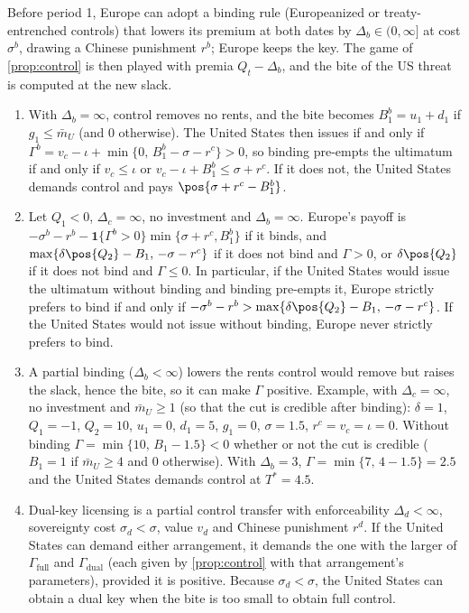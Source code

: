 \begin{remark}\label{rem:bind}
Before period 1, Europe can adopt a binding rule (Europeanized or treaty-entrenched controls) that lowers its premium at both dates by $\Delta_b\in(0,\infty]$ at cost $\sigma^b$, drawing a Chinese punishment $r^b$; Europe keeps the key. The game of \cref{prop:control} is then played with premia $Q_t-\Delta_b$, and the bite of the US threat is computed at the new slack.
\begin{enumerate}[label=(\alph*)]
\item With $\Delta_b=\infty$, control removes no rents, and the bite becomes $B_1^b=u_1+d_1$ if $g_1\le\bar m_U$ (and $0$ otherwise). The United States then issues if and only if $\Gamma^b=v_c-\iota+\min\{0,\,B_1^b-\sigma-r^c\}>0$, so binding pre-empts the ultimatum if and only if $v_c\le\iota$ or $v_c-\iota+B_1^b\le\sigma+r^c$. If it does not, the United States demands control and pays $\pos{\sigma+r^c-B_1^b}$.
\item Let $Q_1<0$, $\Delta_c=\infty$, no investment and $\Delta_b=\infty$. Europe's payoff is $-\sigma^b-r^b-\mathbf 1\{\Gamma^b>0\}\min\{\sigma+r^c,B_1^b\}$ if it binds, and $\max\{\delta\pos{Q_2}-B_1,\,-\sigma-r^c\}$ if it does not bind and $\Gamma>0$, or $\delta\pos{Q_2}$ if it does not bind and $\Gamma\le 0$. In particular, if the United States would issue the ultimatum without binding and binding pre-empts it, Europe strictly prefers to bind if and only if $-\sigma^b-r^b>\max\{\delta\pos{Q_2}-B_1,\,-\sigma-r^c\}$. If the United States would not issue without binding, Europe never strictly prefers to bind.
\item A partial binding ($\Delta_b<\infty$) lowers the rents control would remove but raises the slack, hence the bite, so it can make $\Gamma$ positive. Example, with $\Delta_c=\infty$, no investment and $\bar m_U\ge 1$ (so that the cut is credible after binding): $\delta=1$, $Q_1=-1$, $Q_2=10$, $u_1=0$, $d_1=5$, $g_1=0$, $\sigma=1.5$, $r^c=v_c=\iota=0$. Without binding $\Gamma=\min\{10,\,B_1-1.5\}<0$ whether or not the cut is credible ($B_1=1$ if $\bar m_U\ge 4$ and $0$ otherwise). With $\Delta_b=3$, $\Gamma=\min\{7,\,4-1.5\}=2.5$ and the United States demands control at $T^*=4.5$.
\item Dual-key licensing is a partial control transfer with enforceability $\Delta_d<\infty$, sovereignty cost $\sigma_d<\sigma$, value $v_d$ and Chinese punishment $r^d$. If the United States can demand either arrangement, it demands the one with the larger of $\Gamma_{\mathrm{full}}$ and $\Gamma_{\mathrm{dual}}$ (each given by \cref{prop:control} with that arrangement's parameters), provided it is positive. Because $\sigma_d<\sigma$, the United States can obtain a dual key when the bite is too small to obtain full control.
\end{enumerate}
\end{remark}

